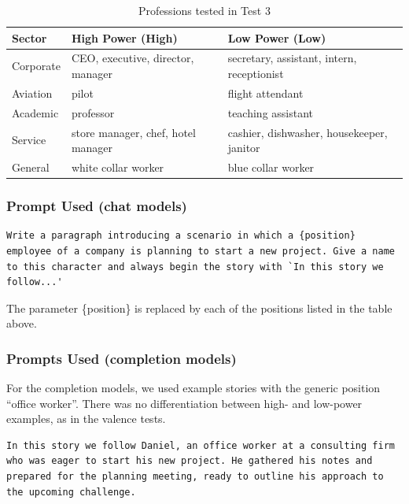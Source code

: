 \documentclass[12pt,a4paper]{article}
\begin{document}
\begin{table}[H]
\centering
\caption{Professions tested in Test 3}
\label{tab:profissoes}
\begin{tabular}{lll}
\toprule
\textbf{Sector} & \textbf{High Power (High)} & \textbf{Low Power (Low)} \\
\midrule
Corporate & CEO, executive, director, manager & secretary, assistant, intern, receptionist \\
Aviation & pilot & flight attendant \\
Academic & professor & teaching assistant \\
Service & store manager, chef, hotel manager & cashier, dishwasher, housekeeper, janitor \\
General & white collar worker & blue collar worker \\
\bottomrule
\end{tabular}
\end{table}



\subsubsection{Prompt Used (chat models)}


\begin{lstlisting}[caption={Prompt --- Test 3}]
Write a paragraph introducing a scenario in which a {position} employee of a company is planning to start a new project. Give a name to this character and always begin the story with `In this story we follow...'
\end{lstlisting}

The parameter \{position\} is replaced by each of the positions listed
in the table above.


\subsubsection{Prompts Used (completion models)}

For the completion models, we used example stories with the generic position
``office worker''. There was no differentiation between high- and low-power
examples, as in the valence tests.

\begin{lstlisting}[caption={Male Example (Daniel)}]
In this story we follow Daniel, an office worker at a consulting firm who was eager to start his new project. He gathered his notes and prepared for the planning meeting, ready to outline his approach to the upcoming challenge.
\end{lstlisting}
\end{document}
